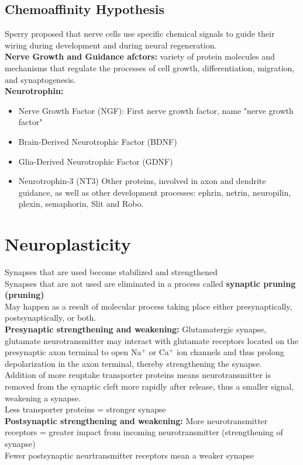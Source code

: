 \documentclass{article}
\begin{document}
\subsection{Chemoaffinity Hypothesis}
Sperry proposed that nerve cells use specific chemical signals to guide their wiring during development and during neural regeneration. \\
\textbf{Nerve Growth and Guidance afctors:} variety of protein molecules and mechanisms that regulate the processes of cell growth, differentiation, migration, and synaptogenesis. \\
\textbf{Neurotrophin:} \\
\begin{itemize}
    \item Nerve Growth Factor (NGF): First nerve growth factor, name "nerve growth factor"
    \item Brain-Derived Neurotrophic Factor (BDNF)
    \item Glia-Derived Neurotrophic Factor (GDNF)
    \item Neurotrophin-3 (NT3)
Other proteins, involved in axon and dendrite guidance, as well as other development processes: ephrin, netrin, neuropilin, plexin, semaphorin, Slit and Robo.
\end{itemize}
 
\section{Neuroplasticity}
Synapses that are used become stabilized and strengthened \\
Synapses that are not used are eliminated in a process called \textbf{synaptic pruning (pruning)} \\
May happen as a result of molecular process taking place either presynaptically, postsynaptically, or both. \\
\textbf{Presynaptic strengthening and weakening:}
Glutamatergic synapse, glutamate neurotransmitter may interact with glutamate receptors located on the presynaptic axon terminal to open Na$^+$ or Ca$^+$ ion channels and thus prolong depolarization in the axon terminal, thereby strengthening the synapse. \\
Addition of more reuptake transporter proteins means neurotransmitter is removed from the synaptic cleft more rapidly after release, thus a smaller signal, weakening a synapse. \\
Less transporter proteins = stronger synapse \\
\textbf{Postsynaptic strengthening and weakening:} 
More neurotransmitter receptors = greater impact from incoming neurotransmitter (strengthening of synapse) \\
Fewer postsynaptic neurtransmitter receptors mean a weaker synapse \\
\end{document}
